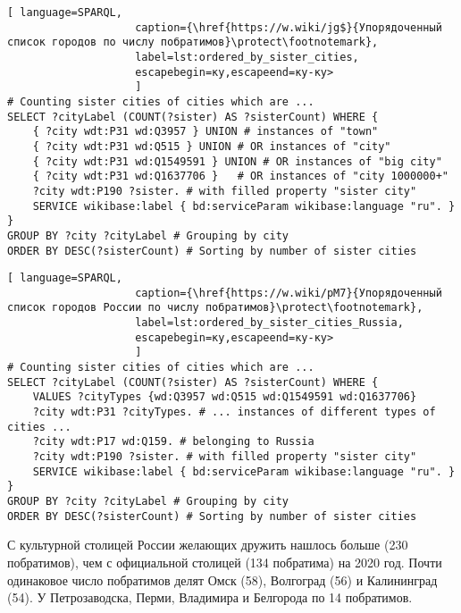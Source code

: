\begin{lstlisting}[ language=SPARQL, 
                    caption={\href{https://w.wiki/jg$}{Упорядоченный список городов по числу побратимов}\protect\footnotemark},
                    label=lst:ordered_by_sister_cities, 
                    escapebegin=ку,escapeend=ку-ку>
                    ]
# Counting sister cities of cities which are ...
SELECT ?cityLabel (COUNT(?sister) AS ?sisterCount) WHERE {           
	{ ?city wdt:P31 wd:Q3957 } UNION # instances of "town"
	{ ?city wdt:P31 wd:Q515 } UNION # OR instances of "city"
	{ ?city wdt:P31 wd:Q1549591 } UNION # OR instances of "big city"
	{ ?city wdt:P31 wd:Q1637706 }	# OR instances of "city 1000000+"
	?city wdt:P190 ?sister. # with filled property "sister city"
	SERVICE wikibase:label { bd:serviceParam wikibase:language "ru". }
}
GROUP BY ?city ?cityLabel # Grouping by city                                   
ORDER BY DESC(?sisterCount) # Sorting by number of sister cities
\end{lstlisting}

\begin{lstlisting}[ language=SPARQL, 
                    caption={\href{https://w.wiki/pM7}{Упорядоченный список городов России по числу побратимов}\protect\footnotemark},
                    label=lst:ordered_by_sister_cities_Russia, 
                    escapebegin=ку,escapeend=ку-ку>
                    ]
# Counting sister cities of cities which are ...
SELECT ?cityLabel (COUNT(?sister) AS ?sisterCount) WHERE {           
	VALUES ?cityTypes {wd:Q3957 wd:Q515 wd:Q1549591 wd:Q1637706}
	?city wdt:P31 ?cityTypes. # ... instances of different types of cities ... 
	?city wdt:P17 wd:Q159. # belonging to Russia
	?city wdt:P190 ?sister. # with filled property "sister city"
	SERVICE wikibase:label { bd:serviceParam wikibase:language "ru". }
}
GROUP BY ?city ?cityLabel # Grouping by city
ORDER BY DESC(?sisterCount) # Sorting by number of sister cities
\end{lstlisting}

С культурной столицей России желающих дружить нашлось больше (230 побратимов), чем с официальной столицей (134 побратима) на 2020 год. Почти одинаковое число побратимов делят Омск (58), Волгоград (56) и Калининград (54). У Петрозаводска, Перми, Владимира и Белгорода по 14 побратимов.

